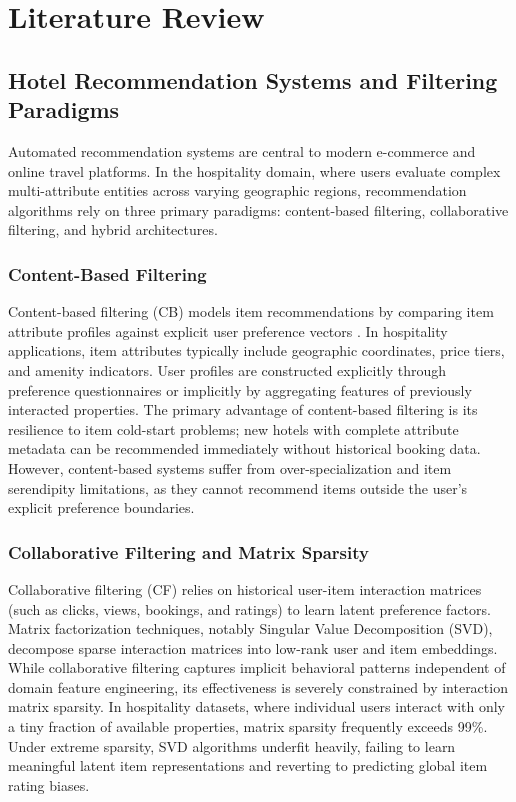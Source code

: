 \chapter{Literature Review}\label{ch:lit_review}

\section{Hotel Recommendation Systems and Filtering Paradigms}
Automated recommendation systems are central to modern e-commerce and online travel platforms. In the hospitality domain, where users evaluate complex multi-attribute entities across varying geographic regions, recommendation algorithms rely on three primary paradigms: content-based filtering, collaborative filtering, and hybrid architectures.

\subsection{Content-Based Filtering}
Content-based filtering (CB) models item recommendations by comparing item attribute profiles against explicit user preference vectors \cite{Ramesh2020}. In hospitality applications, item attributes typically include geographic coordinates, price tiers, and amenity indicators. User profiles are constructed explicitly through preference questionnaires or implicitly by aggregating features of previously interacted properties. The primary advantage of content-based filtering is its resilience to item cold-start problems; new hotels with complete attribute metadata can be recommended immediately without historical booking data. However, content-based systems suffer from over-specialization and item serendipity limitations, as they cannot recommend items outside the user's explicit preference boundaries.

\subsection{Collaborative Filtering and Matrix Sparsity}
Collaborative filtering (CF) relies on historical user-item interaction matrices (such as clicks, views, bookings, and ratings) to learn latent preference factors. Matrix factorization techniques, notably Singular Value Decomposition (SVD), decompose sparse interaction matrices into low-rank user and item embeddings. While collaborative filtering captures implicit behavioral patterns independent of domain feature engineering, its effectiveness is severely constrained by interaction matrix sparsity. In hospitality datasets, where individual users interact with only a tiny fraction of available properties, matrix sparsity frequently exceeds 99\%. Under extreme sparsity, SVD algorithms underfit heavily, failing to learn meaningful latent item representations and reverting to predicting global item rating biases.

